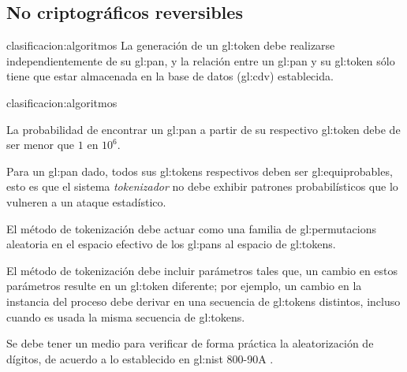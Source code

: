 %
%

\subsection{No criptográficos reversibles}

{clasificacion:algoritmos}
{
  La generación de un \gls{gl:token} debe realizarse independientemente de
  su \gls{gl:pan}, y la relación entre un \gls{gl:pan} y su \gls{gl:token}
  sólo tiene que estar almacenada en la base de datos (\gls{gl:cdv})
  establecida.
}

{clasificacion:algoritmos}
{
  La probabilidad de encontrar un \gls{gl:pan} a partir de su respectivo
  \gls{gl:token} debe de ser menor que $1$ en $10^6$.

  {
    Para un \gls{gl:pan} dado, todos sus \glspl{gl:token} respectivos
    deben ser \glspl{gl:equiprobable}, esto es que el sistema
    \textit{tokenizador} no debe exhibir patrones probabilísticos que
    lo vulneren a un ataque estadístico.
  }

  {
    El método de tokenización debe actuar como una familia de
    \glspl{gl:permutacion} aleatoria en el espacio efectivo de los
    \glspl{gl:pan} al espacio de \glspl{gl:token}.
  }

  {
    El método de tokenización debe incluir parámetros tales que, un
    cambio en estos parámetros resulte en un \gls{gl:token} diferente;
    por ejemplo, un cambio en la instancia del proceso debe derivar en
    una secuencia de \glspl{gl:token} distintos, incluso cuando es usada
    la misma secuencia de \glspl{gl:token}.
  }


  {
    Se debe tener un medio para verificar de forma práctica la aleatorización
    de dígitos, de acuerdo a lo establecido en \gls{gl:nist} 800-90A
    \cite{nist_aleatorios}.
  }
}

